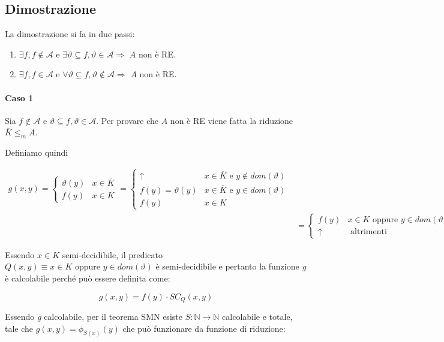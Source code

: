 \subsection{Dimostrazione}

La dimostrazione si fa in due passi:

\begin{enumerate}
	\item $\exists f, f \notin \mathcal{A}$ e $\exists \vartheta \subseteq f, \vartheta \in \mathcal{A} \Rightarrow$ $A$ non è RE.
	\item $\exists f, f \in \mathcal{A}$ e $\forall \vartheta \subseteq f, \vartheta \notin \mathcal{A} \Rightarrow$ $A$ non è RE.
\end{enumerate}

\paragraph{Caso 1}

Sia $f \notin \mathcal{A}$ e $\vartheta \subseteq f, \vartheta \in \mathcal{A}$. Per provare che $A$ non è RE viene fatta la riduzione $\overline{K} \leq_m A$.

Definiamo quindi 

\begin{align*}
	g(x,y) = \begin{cases}
		\vartheta(y) & x \in \overline{K} \\
		f(y) & x \in K
	\end{cases} = \begin{cases}
	\uparrow & x \in \overline{K} \text{ e } y \notin dom(\vartheta) \\
	f(y) = \vartheta(y)  & x \in \overline{K} \text{ e } y \in dom(\vartheta) \\
	f(y) & x \in K  
	\end{cases} \\
	&= \begin{cases}
	f(y) &x \in K \text{ oppure } y \in dom(\vartheta)\\
	\uparrow & \text{ altrimenti}
	\end{cases} 
\end{align*}

Essendo $x \in K$ semi-decidibile, il predicato $Q(x,y) \equiv x \in K \text{ oppure } y \in dom(\vartheta)$ è semi-decidibile e pertanto la funzione \textit{g} è calcolabile perché può essere definita come:

$$
g(x,y) = f(y) \cdot SC_Q(x,y)
$$

Essendo \textit{g} calcolabile, per il teorema SMN esiste $S : \mathbb{N} \rightarrow \mathbb{N}$ calcolabile e totale, tale che $g(x,y)  = \phi_{S(x)}(y)$ che può funzionare da funzione di riduzione:

